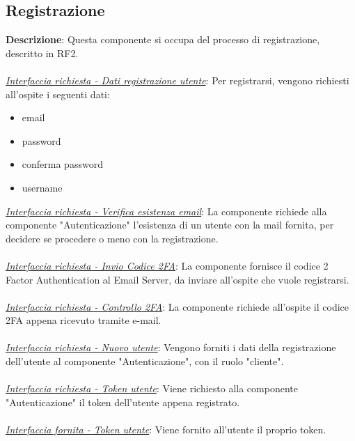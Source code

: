 \documentclass{report}
\begin{document}
\subsection*{Registrazione}
\textbf{Descrizione}: Questa componente si occupa del processo di registrazione, descritto in RF2.\\ \\ 
\uline{\textit{Interfaccia richiesta - Dati registrazione utente}}: 
Per registrarsi, vengono richiesti all'ospite i seguenti dati:
\begin{itemize}
	\item email
	\item password
	\item conferma password
	\item username
\end{itemize}
\uline{\textit{Interfaccia richiesta - Verifica esistenza email}}: 
La componente richiede alla componente "Autenticazione" l'esistenza di un utente con la mail fornita,
per decidere se procedere o meno con la registrazione.\\ \\ 
\uline{\textit{Interfaccia richiesta - Invio Codice 2FA}}: 
La componente fornisce il codice 2 Factor Authentication al Email Server, da inviare all'ospite che vuole registrarsi.\\ \\ 
\uline{\textit{Interfaccia richiesta - Controllo 2FA}}: 
La componente richiede all'ospite il codice 2FA appena ricevuto tramite e-mail.\\ \\ 
\uline{\textit{Interfaccia richiesta - Nuovo utente}}: 
Vengono forniti i dati della registrazione dell'utente al componente "Autenticazione", con il ruolo "cliente".\\ \\ 
\uline{\textit{Interfaccia richiesta - Token utente}}: 
Viene richiesto alla componente "Autenticazione" il token dell'utente appena registrato.\\ \\ 
\uline{\textit{Interfaccia fornita - Token utente}}: 
Viene fornito all'utente il proprio token.

\end{document}
